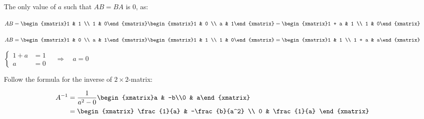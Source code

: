 \begin{exercise}{8}
  The only value of $a$ such that $AB = BA$ is $0$, as:
  \medskip

  $AB = \begin{xmatrix}1 & 1 \\ 1 & 0\end{xmatrix}
        \begin{xmatrix}1 & 0 \\ a & 1\end{xmatrix}
      = \begin{xmatrix}1 + a & 1 \\ 1 & 0\end{xmatrix}$
  \medskip

  $AB = \begin{xmatrix}1 & 0 \\ a & 1\end{xmatrix}
        \begin{xmatrix}1 & 1 \\ 1 & 0\end{xmatrix}
      = \begin{xmatrix}1 & 1 \\ 1 + a & a\end{xmatrix}$
  \medskip

  $\left\{
    \begin{aligned}
      1 + a &= 1 \\
          a &= 0
    \end{aligned}
  \right.\quad \Longrightarrow \quad a = 0$
\end{exercise}

\begin{exercise}{10}
  Follow the formula for the inverse of $2\times2$-matrix:

  \begin{align*}
    A^{-1} &= \frac{1}{a^2-0}\begin{xmatrix}a & -b\\0 & a\end{xmatrix} \\
           &= \begin{xmatrix}
                \frac{1}{a} & -\frac{b}{a^2} \\
                          0 &  \frac{1}{a}
              \end{xmatrix}
  \end{align*}
\end{exercise}

